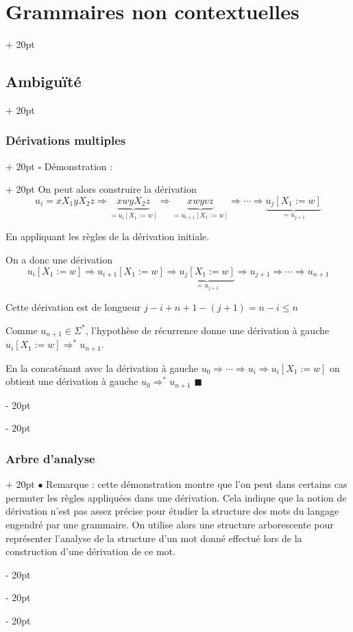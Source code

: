 \documentclass[a4paper, 12pt, twoside]{article}
\renewcommand{\le}{\leqslant}
\newcommand{\ind}[1][20pt]{\advance\leftskip + #1}
\newcommand{\deind}[1][20pt]{\advance\leftskip - #1}
\newenvironment{indt}[2][20pt]{#2 \par \ind[#1]}{\par \deind} %
\newenvironment{proof}[1][{Démonstration :}]{\begin{indt}{$\square$ #1}}{$\blacksquare$ \end{indt}}
\begin{document}
\begin{indt}{\section{Grammaires non contextuelles}}
\begin{indt}{\subsection{Ambiguïté}}
\begin{indt}{\subsubsection{Dérivations multiples}}
\begin{proof}
                     On peut alors construire la dérivation
                     \[
                         u_i = x X_1 y X_2 z
                         \Rightarrow
                         \underbrace{xwy X_2 z}_{= u_i [X_1 := w]}
                         \Rightarrow
                         \underbrace{xwyvz}_{= u_{i + 1} [X_1 := w]}
                         \Rightarrow \cdots
                         \Rightarrow
                         \underbrace{u_j [X_1 := w]}_{= u_{j + 1}}
                     \]

                     En appliquant les règles de la dérivation initiale.

                     On a donc une dérivation
                     \[
                         u_i [X_1 := w]
                         \Rightarrow
                         u_{i + 1} [X_1 := w]
                         \Rightarrow
                         \underbrace{u_{j} [X_1 := w]}_{= u_{j + 1}}
                         \Rightarrow
                          u_{j + 1}
                          \Rightarrow
                          \cdots
                          \Rightarrow
                          u_{n + 1}
                     \]

                     Cette dérivation est de longueur $j - i + n + 1 - (j + 1) = n - i \le n$

                     Comme $u_{n + 1} \in \Sigma^*$, l'hypothèse de récurrence donne une dérivation à gauche $u_i [X_1 := w] \Rightarrow^* u_{n + 1}$.

                     En la concaténant avec la dérivation à gauche $u_0 \Rightarrow \cdots \Rightarrow u_i \Rightarrow u_i [X_1 := w]$ on obtient une dérivation à gauche $u_0 \Rightarrow^* u_{n + 1}$
                \end{proof}
            \end{indt}

            \vspace{12pt}
            
            \begin{indt}{\subsubsection{Arbre d'analyse}}
                $\bullet$ Remarque : cette démonstration montre que l'on peut dans certains cas permuter les règles appliquées dans une dérivation.
                Cela indique que la notion de dérivation n'est pas assez précise pour étudier la structure des mots du langage engendré par une grammaire.
                On utilise alors une structure arborescente pour représenter l'analyse de la structure d'un mot donné effectué lors de la construction d'une dérivation de ce mot.


\end{indt}
\end{indt}
\end{indt}
\end{document}
